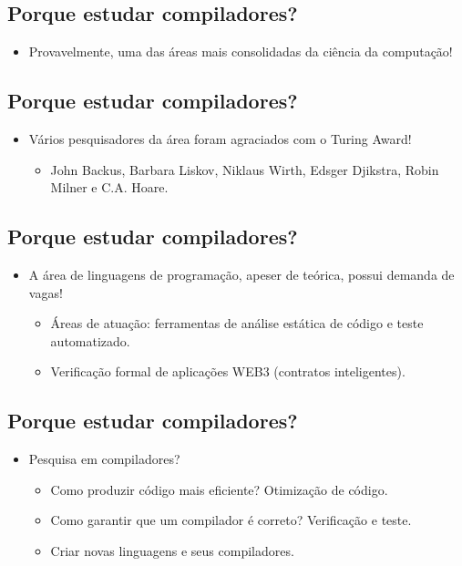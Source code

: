 \documentclass[11pt]{article}
\begin{document}
\subsection*{Porque estudar compiladores?}
\label{sec:org3c74e2d}

\begin{itemize}
\item Provavelmente, uma das áreas mais consolidadas da ciência da computação!
\end{itemize}
\subsection*{Porque estudar compiladores?}
\label{sec:org3473049}

\begin{itemize}
\item Vários pesquisadores da área foram agraciados com o Turing Award!
\begin{itemize}
\item John Backus, Barbara Liskov, Niklaus Wirth, Edsger Djikstra, Robin Milner e C.A. Hoare.
\end{itemize}
\end{itemize}
\subsection*{Porque estudar compiladores?}
\label{sec:org68a937b}

\begin{itemize}
\item A área de linguagens de programação, apeser de teórica, possui demanda de vagas!
\begin{itemize}
\item Áreas de atuação: ferramentas de análise estática de código e teste automatizado.
\item Verificação formal de aplicações WEB3 (contratos inteligentes).
\end{itemize}
\end{itemize}
\subsection*{Porque estudar compiladores?}
\label{sec:orge5c06c5}

\begin{itemize}
\item Pesquisa em compiladores?
\begin{itemize}
\item Como produzir código mais eficiente? Otimização de código.
\item Como garantir que um compilador é correto? Verificação e teste.
\item Criar novas linguagens e seus compiladores.
\end{itemize}
\end{itemize}
\end{document}
